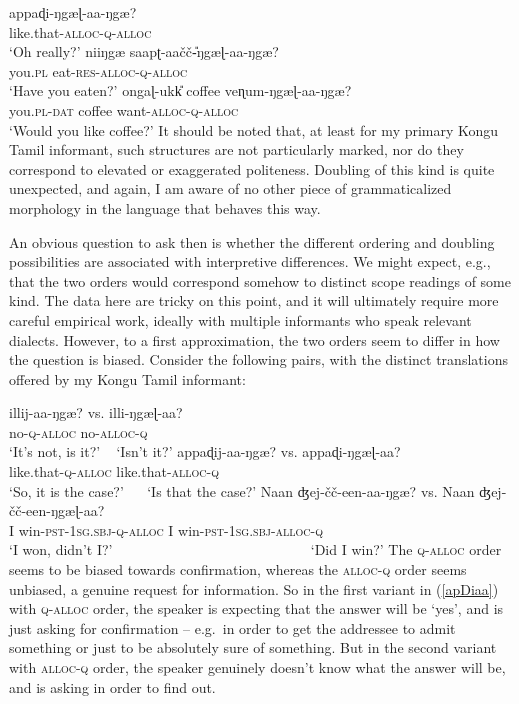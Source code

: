 \documentclass[output=paper, modfonts, nonflat]{langsci/langscibook}
\begin{document}
\ea\label{double}
 \ea\label{apdidouble}\gll appaɖi-ŋgæɭ-aa-ŋgæ?\\
 like.that-\textsc{alloc}-\textsc{q}-\textsc{alloc}\\
 \glt `Oh really?'
 \ex\label{saapdouble}\gll niiŋgæ{} saapʈ-aa\v{c}\v{c}\U-ŋgæɭ-aa-ŋgæ?\\
 you.\textsc{pl} eat-\textsc{res}-\textsc{alloc}-\textsc{q}-\textsc{alloc}\\
 \glt `Have you eaten?'
 \ex\label{coffeedouble}\gll ongaɭ-ukk\U{} coffee veɳum-ŋgæɭ-aa-ŋgæ?\\
 you.\textsc{pl}-\textsc{dat}{} coffee want-\textsc{alloc}-\textsc{q}-\textsc{alloc}\\
 \glt `Would you like coffee?'
 \z
\z
%
It should be noted that, at least for my primary Kongu Tamil
informant, such structures are not particularly marked, nor do they
correspond to elevated or exaggerated politeness.  Doubling of this
kind is quite unexpected, and again, I am aware of no other piece of
grammaticalized morphology in the language that behaves this
way.

An obvious question to ask then is whether the different ordering and
doubling possibilities are associated with interpretive
differences. We might expect, e.g., that the two orders would
correspond somehow to distinct scope readings of some kind. The data
here are tricky on this point, and it will ultimately require more
careful empirical work, ideally with multiple informants who speak
relevant dialects. However, to a first approximation, the two orders
seem to differ in how the question is biased. Consider the following
pairs, with the distinct translations offered by my Kongu Tamil
informant:

\ea
 \ea\gll illij-aa-ŋgæ? {vs.} illi-ŋgæɭ-aa?\\
 no-\textsc{q}-\textsc{alloc}{} {} no-\textsc{alloc}-\textsc{q}\\
 \glt `It's not, is it?' ~ `Isn't it?'
 \ex\gll appaɖij-aa-ŋgæ? {vs.} appaɖi-ŋgæɭ-aa?\label{apDiaa}\\
 like.that-\textsc{q}-\textsc{alloc}{} {} like.that-\textsc{alloc}-\textsc{q}\\
 \glt `So, it is the case?' ~~ `Is that the case?'
 \ex\gll Naan ʤej-\v{c}\v{c}-een-aa-ŋgæ? {vs.} Naan ʤej-\v{c}\v{c}-een-ŋgæɭ-aa?\\
 I win-\textsc{pst}-1\textsc{sg}.\textsc{sbj}-\textsc{q}-\textsc{alloc}{} {} I win-\textsc{pst}-1\textsc{sg}.\textsc{sbj}-\textsc{alloc}-\textsc{q}\\
 \glt `I won, didn't I?' ~~~~~~~~~~~~~~~~~~~~~~~~~~~ `Did I win?'
 \z
\z
%
The \textsc{q}-\textsc{alloc}{} order seems to be biased towards confirmation,
whereas the \textsc{alloc}{}-\textsc{q} order seems unbiased, a genuine
request for information. So in the first variant in (\ref{apDiaa})
with \textsc{q}-\textsc{alloc}{} order, the speaker is expecting that the
answer will be `yes', and is just asking for confirmation -- e.g.\ in
order to get the addressee to admit something or just to be absolutely
sure of something. But in the second variant with \textsc{alloc}{}-\textsc{q}
order, the speaker genuinely doesn't know what the answer will be, and
is asking in order to find out. 
\end{document}
